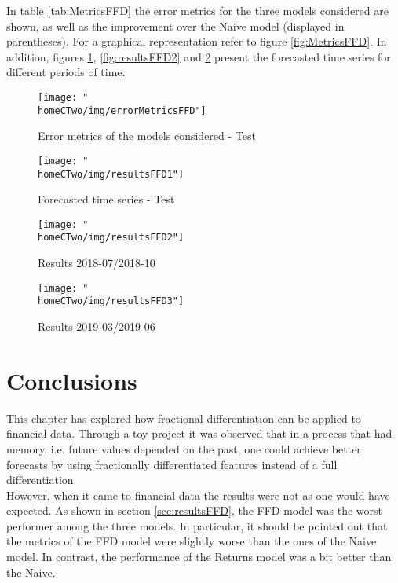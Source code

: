 \documentclass[a4paper]{report}
\newcommand{\homeCTwo}{../../Chapter 2 - FracDiff/Draft}
\begin{document}
In table \ref{tab:MetricsFFD} the error metrics for the three models 
considered are shown, as well as the improvement over the Naive model 
(displayed in parentheses). For a graphical representation refer to figure
\ref{fig:MetricsFFD}. In addition, figures \ref{fig:resultsFFD1}, 
\ref{fig:resultsFFD2} and \ref{fig:resultsFFD3} present the forecasted time 
series for different periods of time.

\begin{figure}[htbp]
	\centering
	\begin{minipage}{.5\textwidth}
  		\centering
		\texttt{[image: "\\homeCTwo/img/errorMetricsFFD"]}
		\caption{Error metrics of the models considered - Test}
		\label{fig:MetricsFFD}
	\end{minipage}%
	\begin{minipage}{.5\textwidth}
  		\centering
		\texttt{[image: "\\homeCTwo/img/resultsFFD1"]}
		\caption{Forecasted time series - Test}
		\label{fig:resultsFFD1}
	\end{minipage}
\end{figure}


\begin{figure}[htbp]
	\centering
	\begin{minipage}{.5\textwidth}
  		\centering
  		\texttt{[image: "\\homeCTwo/img/resultsFFD2"]}
  		\caption{Results 2018-07/2018-10}
  		\label{fig:resultsFFD2}
	\end{minipage}%
	\begin{minipage}{.5\textwidth}
  		\centering
  		\texttt{[image: "\\homeCTwo/img/resultsFFD3"]}
  		\caption{Results 2019-03/2019-06}
  		\label{fig:resultsFFD3}
	\end{minipage}
\end{figure}

\newpage

\section{Conclusions}
This chapter has explored how fractional differentiation can be applied to 
financial data. Through a toy project it was observed that in a process that
had memory, i.e. future values depended on the past, one could achieve better 
forecasts by using fractionally differentiated features instead of a full 
differentiation.\\

However, when it came to financial data the results were not as one would 
have expected. As shown in section \ref{sec:resultsFFD}, the FFD model was 
the worst performer among the three models. In particular, it should be 
pointed out that the metrics of the FFD model were slightly worse than the 
ones of 	the Naive model. In contrast, the performance of the Returns model 
was a bit better than the Naive.\\
\end{document}

